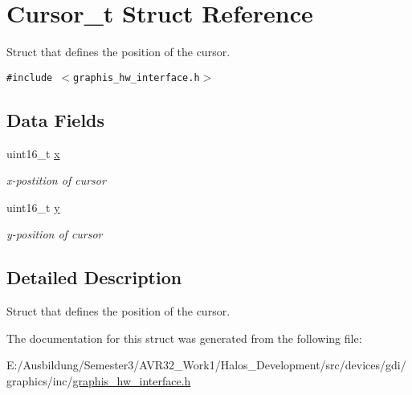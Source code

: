 \hypertarget{struct_cursor__t}{
\section{Cursor\_\-t Struct Reference}
\label{struct_cursor__t}
}
Struct that defines the position of the cursor.  


{\tt \#include $<$graphis\_\-hw\_\-interface.h$>$}

\subsection*{Data Fields}
\begin{CompactItemize}
\item 
\hypertarget{struct_cursor__t_41cf15528b7307c8d71a6a874fc29a1a}{
uint16\_\-t \hyperlink{struct_cursor__t_41cf15528b7307c8d71a6a874fc29a1a}{x}}
\label{struct_cursor__t_41cf15528b7307c8d71a6a874fc29a1a}

\begin{CompactList}\small\item\em x-postition of cursor \item\end{CompactList}\item 
\hypertarget{struct_cursor__t_1416c147ae9fce480335dbe6160398e7}{
uint16\_\-t \hyperlink{struct_cursor__t_1416c147ae9fce480335dbe6160398e7}{y}}
\label{struct_cursor__t_1416c147ae9fce480335dbe6160398e7}

\begin{CompactList}\small\item\em y-position of cursor \item\end{CompactList}\end{CompactItemize}


\subsection{Detailed Description}
Struct that defines the position of the cursor. 

The documentation for this struct was generated from the following file:\begin{CompactItemize}
\item 
E:/Ausbildung/Semester3/AVR32\_\-Work1/Halos\_\-Development/src/devices/gdi/graphics/inc/\hyperlink{graphis__hw__interface_8h}{graphis\_\-hw\_\-interface.h}\end{CompactItemize}
